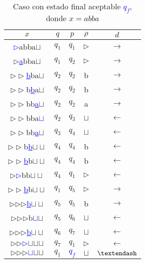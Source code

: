 \documentclass[letterpaper,11pt]{article}
\begin{document}
\begin{table}[h!]
\centering
\begin{tabular}{c|c|c|c|c}
\hline
$x$ & $q$ & $p$ & $\rho$ & $d$ \\ \hline
\textcolor{blue}{\underline{$\rhd$}}abba$\sqcup$  & $q_1$ & $q_1$ & $\rhd$ & $\rightarrow$  \\
$\rhd$\textcolor{blue}{\underline{a}}bba$\sqcup$  & $q_1$ & $q_2$ & $\rhd$ & $\rightarrow$  \\
$\rhd\rhd$\textcolor{blue}{\underline{b}}ba$\sqcup$  & $q_2$ & $q_2$ & b & $\rightarrow$  \\
$\rhd\rhd$b\textcolor{blue}{\underline{b}}a$\sqcup$  & $q_2$ & $q_2$ & b & $\rightarrow$  \\
$\rhd\rhd$bb\textcolor{blue}{\underline{a}}$\sqcup$  & $q_2$ & $q_2$ & a & $\rightarrow$  \\
$\rhd\rhd$bba\textcolor{blue}{\underline{$\sqcup$}}  & $q_2$ & $q_3$ & $\sqcup$ & $\leftarrow$  \\
$\rhd\rhd$bb\textcolor{blue}{\underline{a}}$\sqcup$  & $q_3$ & $q_4$ & $\sqcup$ & $\leftarrow$  \\
$\rhd\rhd$b\textcolor{blue}{\underline{b}}$\sqcup\sqcup$  & $q_4$ & $q_4$ & b & $\leftarrow$  \\
$\rhd\rhd$\textcolor{blue}{\underline{b}}b$\sqcup\sqcup$  & $q_4$ & $q_4$ & b & $\leftarrow$  \\
$\rhd$\textcolor{blue}{\underline{$\rhd$}}bb$\sqcup\sqcup$  & $q_4$ & $q_1$ & $\rhd$ & $\leftarrow$  \\
$\rhd\rhd$\textcolor{blue}{\underline{b}}b$\sqcup\sqcup$  & $q_1$ & $q_5$ & $\rhd$ & $\rightarrow$  \\
$\rhd$$\rhd$$\rhd$\textcolor{blue}{\underline{b}}$\sqcup\sqcup$  & $q_5$ & $q_5$ & b & $\rightarrow$  \\
$\rhd$$\rhd$$\rhd$b\textcolor{blue}{\underline{$\sqcup$}}$\sqcup$  & $q_5$ & $q_6$ & $\sqcup$ & $\leftarrow$  \\
$\rhd$$\rhd$$\rhd$\textcolor{blue}{\underline{b}}$\sqcup\sqcup$  & $q_6$ & $q_7$ & $\sqcup$ & $\leftarrow$  \\
$\rhd$$\rhd$\textcolor{blue}{\underline{$\rhd$}}$\sqcup$$\sqcup$$\sqcup$  & $q_7$ & $q_1$ & $\rhd$ & $\leftarrow$  \\
$\rhd$$\rhd$$\rhd$\textcolor{blue}{\underline{$\sqcup$}}$\sqcup$$\sqcup$  & $q_1$ & \textcolor{blue}{$q_f$} & $\sqcup$ & $\textendash$  \\\hline
\end{tabular}
\caption{Caso con estado final aceptable \textcolor{blue}{$q_f$}, donde $x=abba$}
\end{table}
\end{document}
